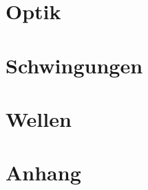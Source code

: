 \documentclass[8pt, a4paper, twoside]{extarticle}
\begin{document}
    \begin{layout}
        \part{Optik}
        
        
        
        
        
    
        \columnbreak

        \part{Schwingungen}
		
        
        
        
        
        \part{Wellen}
		
        
        
        
        

        \part{Anhang}
		
    \end{layout}
\end{document}
